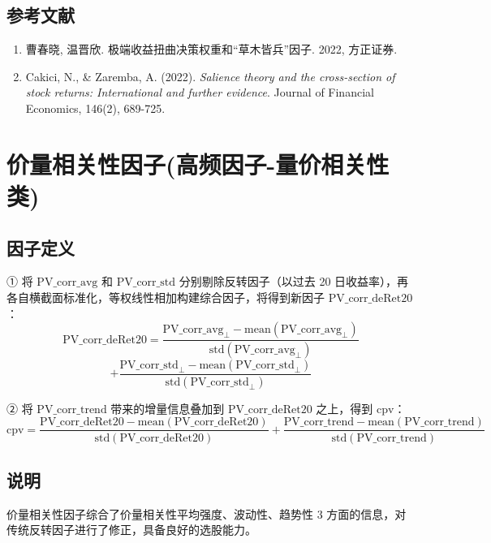 \documentclass{article}
\begin{document}
\subsection{参考文献}
\begin{enumerate}
    \item 曹春晓, 温晋欣. 极端收益扭曲决策权重和“草木皆兵”因子. 2022, 方正证券.
    \item Cakici, N., \& Zaremba, A. (2022). \textit{Salience theory and the cross-section of stock returns: International and further evidence}. Journal of Financial Economics, 146(2), 689-725.
\end{enumerate}

\section{价量相关性因子(高频因子-量价相关性类)}

\subsection{因子定义}

① 将 \( \mathrm{PV\_corr\_avg} \) 和 \( \mathrm{PV\_corr\_std} \) 分别剔除反转因子（以过去 20 日收益率），再各自横截面标准化，等权线性相加构建综合因子，将得到新因子 \( \mathrm{PV\_corr\_deRet20} \)：
\begin{equation}
    \mathrm{PV\_corr\_deRet20} = \frac{\mathrm{PV\_corr\_avg}_{\perp} - \mathrm{mean}(\mathrm{PV\_corr\_avg}_{\perp})}{\mathrm{std}(\mathrm{PV\_corr\_avg}_{\perp})} 
\end{equation}
\begin{equation}
    +\frac{\mathrm{PV\_corr\_std}_{\perp} - \mathrm{mean}(\mathrm{PV\_corr\_std}_{\perp})}{\mathrm{std}(\mathrm{PV\_corr\_std}_{\perp})}
\end{equation}

② 将 \( \mathrm{PV\_corr\_trend} \) 带来的增量信息叠加到 \( \mathrm{PV\_corr\_deRet20} \) 之上，得到 \( \mathrm{cpv} \)：
\begin{equation}
    \mathrm{cpv} = \frac{\mathrm{PV\_corr\_deRet20} - \mathrm{mean}(\mathrm{PV\_corr\_deRet20})}{\mathrm{std}(\mathrm{PV\_corr\_deRet20})} + \frac{\mathrm{PV\_corr\_trend} - \mathrm{mean}(\mathrm{PV\_corr\_trend})}{\mathrm{std}(\mathrm{PV\_corr\_trend})}
\end{equation}

\subsection{说明}
价量相关性因子综合了价量相关性平均强度、波动性、趋势性 3 方面的信息，对传统反转因子进行了修正，具备良好的选股能力。
\end{document}
